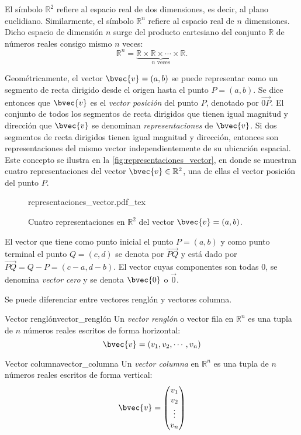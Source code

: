 \documentclass{fmbnotes}
\begin{document}
El símbolo \(\mathbb{R}^{2}\) refiere al espacio real de dos dimensiones, es decir, al plano euclidiano. Similarmente, el símbolo \( \mathbb{R}^{n} \) refiere al espacio real de \(n\) dimensiones. Dicho espacio de dimensión \( n \) surge del producto cartesiano del conjunto \(\mathbb{R}\) de números reales consigo mismo \(n\) veces: 
\[ \mathbb{R}^{n}=\underbrace{\mathbb{R} \times \mathbb{R} \times \cdots \times \mathbb{R}}_{\text{\(n\) veces}}.\]

Geométricamente, el vector \(\bvec{v}=(a,b)\) se puede representar como un segmento de recta dirigido desde el origen hasta el punto \(P=(a,b)\). Se dice entonces que \(\bvec{v}\) es el \emph{vector posición} del punto \(P\), denotado por \(\overrightarrow{0P}\). El conjunto de todos los segmentos de recta dirigidos que tienen igual magnitud y dirección que \(\bvec{v}\) se denominan \emph{representaciones} de \( \bvec{v}\). Si dos segmentos de recta dirigidos tienen igual magnitud y dirección, entonces son representaciones del mismo vector independientemente de su ubicación espacial. Este concepto se ilustra en la \autoref{fig:representaciones_vector}, en donde se muestran cuatro representaciones del vector \(\bvec{v} \in \mathbb{R}^{2}\), una de ellas el vector posición del punto \(P\).

\begin{figure}[h]
\centering
{representaciones_vector.pdf_tex}
\caption{Cuatro representaciones en \(\mathbb{R}^{2}\) del vector \(\bvec{v}=(a,b)\).}
\label{fig:representaciones_vector}
\end{figure}

El vector que tiene como punto inicial el punto \( P=(a,b) \) y como punto terminal el punto \( Q=(c,d) \) se denota por \( \overrightarrow{PQ}\) y está dado por \(\overrightarrow{PQ}=Q-P =(c-a,d-b)\). El vector cuyas componentes son todas 0, se denomina \emph{vector cero} y se denota \(\bvec{0}\) o \(\vec{0}\). 

Se puede diferenciar entre vectores renglón y vectores columna.

\begin{definicion}{Vector renglón}{vector_renglón}
Un \emph{vector renglón} o vector fila en \( \mathbb{R}^{n} \) es una tupla de \( n \) números reales escritos de forma horizontal:
\[\bvec{v}=(v_1,v_2,\cdots,v_n )\]
\end{definicion} 

\begin{definicion}{Vector columna}{vector_columna}
Un \emph{vector columna} en \( \mathbb{R}^{n} \) es una tupla de \( n \) números reales escritos de forma vertical:
\[\bvec{v}=\begin{pmatrix}
v_1 \\ v_2 \\ \vdots \\ v_n
\end{pmatrix}\]
\end{definicion}
\end{document}
